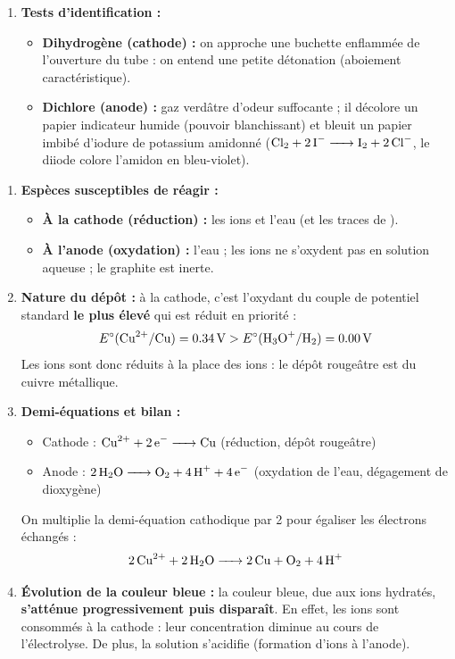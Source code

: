 \documentclass[11pt]{article}
\newcommand{\cle}[1]{{\popxbold\color{popdark}#1}}
\begin{document}
\begin{corrige}
\begin{enumerate}
\item \textbf{Tests d'identification :}
\begin{itemize}
\item \textbf{Dihydrogène  (cathode) :} on approche une buchette enflammée de l'ouverture du tube : on entend une petite détonation (aboiement caractéristique).
\item \textbf{Dichlore  (anode) :} gaz verdâtre d'odeur suffocante ; il décolore un papier indicateur humide (pouvoir blanchissant) et bleuit un papier imbibé d'iodure de potassium amidonné ($\ce{Cl2 + 2I- -> I2 + 2Cl-}$, le diiode colore l'amidon en bleu-violet).
\end{itemize}
\end{enumerate}
\end{corrige}

\begin{corrige}
\begin{enumerate}
\item \textbf{Espèces susceptibles de réagir :}
\begin{itemize}
\item \textbf{À la cathode (réduction) :} les ions  et l'eau  (et les traces de ).
\item \textbf{À l'anode (oxydation) :} l'eau  ; les ions  ne s'oxydent pas en solution aqueuse ; le graphite est inerte.
\end{itemize}

\item \textbf{Nature du dépôt :} à la cathode, c'est l'oxydant du couple de potentiel standard \textbf{le plus élevé} qui est réduit en priorité :
\[ E^\circ(\ce{Cu^2+}/\ce{Cu}) = \SI{0,34}{V} > E^\circ(\ce{H3O+}/\ce{H2}) = \SI{0,00}{V} \]
Les ions  sont donc réduits à la place des ions  : le dépôt rougeâtre est du \cle{cuivre métallique}.

\item \textbf{Demi-équations et bilan :}
\begin{itemize}
\item Cathode : $\ce{Cu^2+ + 2e- -> Cu}$ \quad (réduction, dépôt rougeâtre)
\item Anode : $\ce{2H2O -> O2 + 4H+ + 4e-}$ \quad (oxydation de l'eau, dégagement de dioxygène)
\end{itemize}
On multiplie la demi-équation cathodique par 2 pour égaliser les électrons échangés :
\[ \ce{2Cu^2+ + 2H2O -> 2Cu + O2 + 4H+} \]

\item \textbf{Évolution de la couleur bleue :} la couleur bleue, due aux ions  hydratés, \textbf{s'atténue progressivement puis disparaît}. En effet, les ions  sont consommés à la cathode : leur concentration diminue au cours de l'électrolyse. De plus, la solution s'acidifie (formation d'ions  à l'anode).
\end{enumerate}
\end{corrige}
\end{document}
